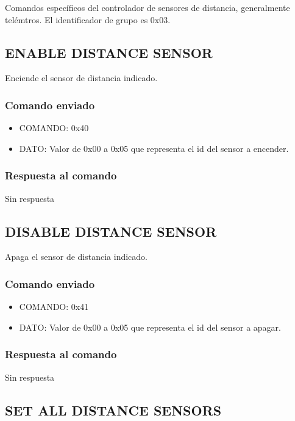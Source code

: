 \documentclass[a4paper,10pt]{article}
\begin{document}
Comandos espec\'ificos del controlador de sensores de distancia, generalmente tel\'emtros.
El identificador de grupo es 0x03.

\subsection{ENABLE DISTANCE SENSOR}
\label{enable_distance_sensor}

Enciende el sensor de distancia indicado.

\subsubsection*{Comando enviado}

\begin{itemize}
	\item{COMANDO:} 0x40
	\item{DATO:} Valor de 0x00 a 0x05 que representa el id del sensor a encender.
\end{itemize}

\subsubsection*{Respuesta al comando}

Sin respuesta

\subsection{DISABLE DISTANCE SENSOR}
\label{disable_distance_sensor}

Apaga el sensor de distancia indicado.

\subsubsection*{Comando enviado}

\begin{itemize}
	\item{COMANDO:} 0x41
	\item{DATO:} Valor de 0x00 a 0x05 que representa el id del sensor a apagar.
\end{itemize}

\subsubsection*{Respuesta al comando}

Sin respuesta

\subsection{SET ALL DISTANCE SENSORS}
\label{set_all_distance_sensors}
\end{document}
